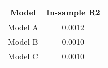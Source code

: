 \begin{tabular}{cc}
\hline
  Model  &  In-sample R2  \\
\hline
 Model A &     0.0012     \\
 Model B &     0.0010     \\
 Model C &     0.0010     \\
\hline
\end{tabular}